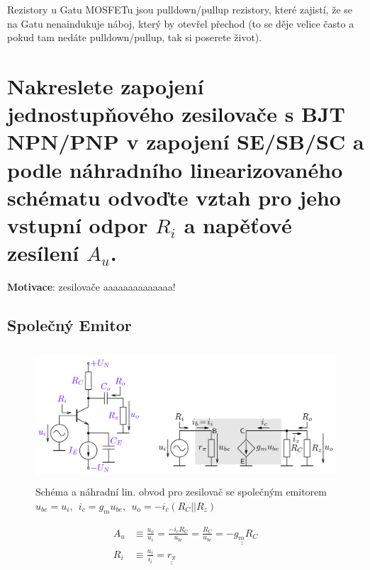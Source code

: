 \documentclass[a4paper,12pt]{article}   %
\begin{document}
Rezistory u Gatu MOSFETu jsou pulldown/pullup rezistory, které zajistí, že se na Gatu nenaindukuje náboj, který by otevřel přechod (to se děje velice často a pokud tam nedáte pulldown/pullup, tak si poserete život).



\section{Nakreslete zapojení jednostupňového zesilovače s BJT NPN/PNP v zapojení SE/SB/SC a podle náhradního linearizovaného schématu odvoďte vztah pro jeho vstupní odpor $R_i$ a napěťové zesílení $A_u$.}
\textbf{Motivace}: zesilovače aaaaaaaaaaaaaa!

\subsection*{Společný Emitor}
\begin{figure}[h!]
    \centering
    \includegraphics[height=5cm]{NPN_SE.PNG}
    \caption{Schéma a náhradní lin. obvod pro zesilovač se společným emitorem\\\centering$u_{be} = u_i,~~i_c=g_mu_{be},~~u_o=-i_c(R_C||R_z)$}
    \label{fig:zes:se}
\end{figure}
\begin{align}
    A_u &\equiv \frac{u_o}{u_i} = \frac{-i_cR_C}{u_{be}} = \frac{R_C}{u_{be}} = \underline{\underline{-g_mR_C}}\\
    R_i &\equiv \frac{u_i}{i_i} = \underline{\underline{r_\pi}}
\end{align}
\end{document}
